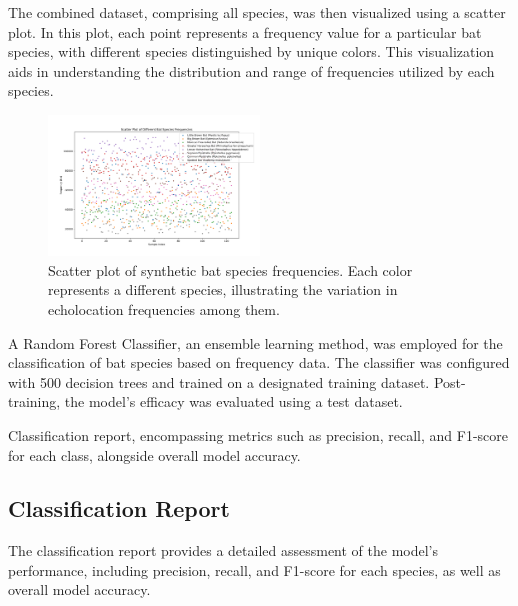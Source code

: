 \documentclass[twocolumn]{article}[ht]
\begin{document}
The combined dataset, comprising all species, was then visualized using a scatter plot. In this plot, each point represents a frequency value for a particular bat species, with different species distinguished by unique colors. This visualization aids in understanding the distribution and range of frequencies utilized by each species.

\begin{figure}[ht]
\centering
\includegraphics[width=0.5\textwidth]{bat_species_freq.png}
\caption{Scatter plot of synthetic bat species frequencies. Each color represents a different species, illustrating the variation in echolocation frequencies among them.}
\end{figure}

A Random Forest Classifier, an ensemble learning method, was employed for the classification of bat species based on frequency data. The classifier was configured with 500 decision trees and trained on a designated training dataset. Post-training, the model's efficacy was evaluated using a test dataset.

Classification report, encompassing metrics such as precision, recall, and F1-score for each class, alongside overall model accuracy.

\subsection{Classification Report}
The classification report provides a detailed assessment of the model's performance, including precision, recall, and F1-score for each species, as well as overall model accuracy.
\end{document}
